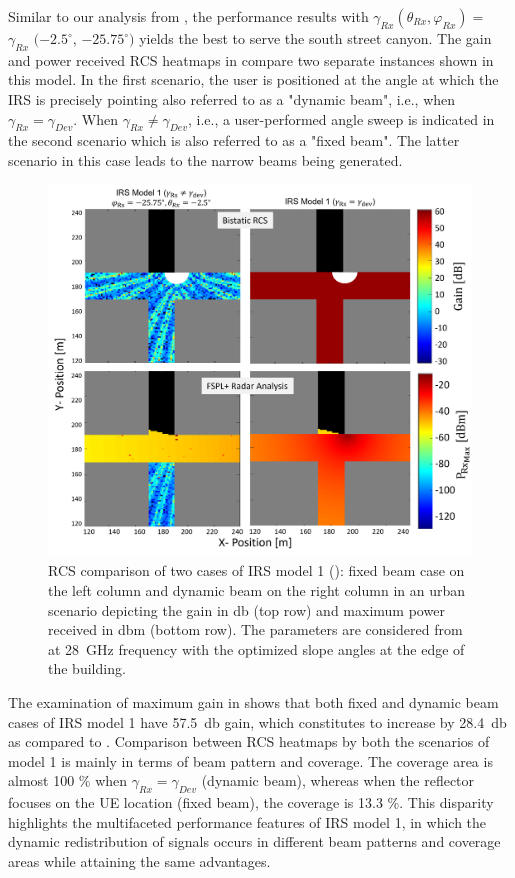 Similar to our analysis from , the performance results with $\gamma_{Rx}(\theta_{Rx},\varphi_{Rx})=$ $\gamma_{Rx}$ $(\num{-2.5}^\circ$, $\num{-25.75}^\circ)$ yields the best to serve the south street canyon. The gain and power received RCS heatmaps in  compare two separate instances shown in this model. In the first scenario, the user is positioned at the angle at which the IRS is precisely pointing also referred to as a "dynamic beam", i.e., when $\gamma_{Rx} = \gamma_{Dev}$. When $\gamma_{Rx} \neq \gamma_{Dev}$, i.e., a user-performed angle sweep is indicated in the second scenario which is also referred to as a "fixed beam". The latter scenario in this case leads to the narrow beams being generated.
\begin{figure}[H]
	\centering
	\includegraphics[width=0.8\linewidth]{images/Section 4 Images/urbanscenario_IRSmodel1s}
	\caption{RCS comparison of two cases of IRS model 1 (): fixed beam case on the left column and dynamic beam on the right column in an urban scenario depicting the gain in \si{\decibel} (top row) and maximum power received in \si{\decibel}m (bottom row). The parameters are considered from  at \SI{28}{\giga\hertz} frequency with the optimized slope angles at the edge of the building.}
	\label{fig:urbanscenario_IRSmodel1s}
\end{figure}

The examination of maximum gain in  shows that both fixed and dynamic beam cases of IRS model 1 have \SI{57.5}{\decibel} gain, which constitutes to increase by \SI{28.4}{\decibel} as compared to . Comparison between RCS heatmaps by both the scenarios of model 1 is mainly in terms of beam pattern and coverage. The coverage area is almost \num{100} \% when $\gamma_{Rx}=\gamma_{Dev}$ (dynamic beam), whereas when the reflector focuses on the UE location (fixed beam), the coverage is \num{13.3} \%. This disparity highlights the multifaceted performance features of IRS model 1, in which the dynamic redistribution of signals occurs in different beam patterns and coverage areas while attaining the same advantages.


